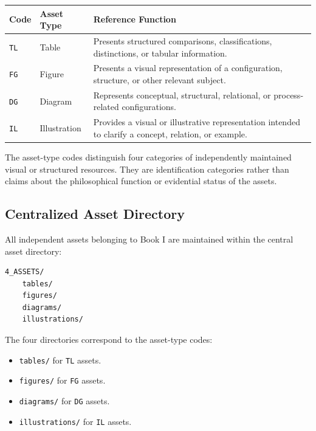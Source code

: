 \begin{center}
\small
\setlength{\tabcolsep}{4pt}
\begin{tabularx}{\textwidth}{
    >{\raggedright\arraybackslash}p{}
    >{\raggedright\arraybackslash}p{}
    >{\raggedright\arraybackslash}X
}
\toprule
\textbf{Code} &
\textbf{Asset Type} &
\textbf{Reference Function}
\\
\midrule

\texttt{TL}
&
Table
&
Presents structured comparisons, classifications,
distinctions, or tabular information.
\\

\texttt{FG}
&
Figure
&
Presents a visual representation of a configuration,
structure, or other relevant subject.
\\

\texttt{DG}
&
Diagram
&
Represents conceptual, structural, relational,
or process-related configurations.
\\

\texttt{IL}
&
Illustration
&
Provides a visual or illustrative representation
intended to clarify a concept, relation, or example.
\\
\bottomrule
\end{tabularx}
\end{center}

The asset-type codes distinguish four categories of
independently maintained visual or structured resources.
They are identification categories rather than claims
about the philosophical function or evidential status
of the assets.

\subsection*{Centralized Asset Directory}

All independent assets belonging to Book I are maintained
within the central asset directory:

\begin{verbatim}
4_ASSETS/
    tables/
    figures/
    diagrams/
    illustrations/
\end{verbatim}

The four directories correspond to the asset-type codes:

\begin{itemize}
    \item \texttt{tables/} for \texttt{TL} assets.
    \item \texttt{figures/} for \texttt{FG} assets.
    \item \texttt{diagrams/} for \texttt{DG} assets.
    \item \texttt{illustrations/} for \texttt{IL} assets.
\end{itemize}

